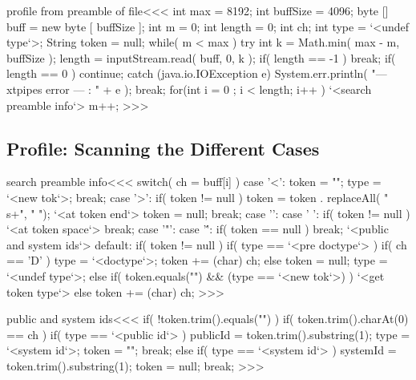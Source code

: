 \documentclass{article}
\begin{document}
 
 
\<profile from preamble of file\><<< 
int max = 8192; 
int buffSize = 4096;
byte [] buff = new byte [ buffSize ];
int m = 0; 
int length = 0; 
int ch;
int type = `<undef type`>;
String token = null;
while( m < max ){ 
   try{ 
      int k = Math.min( max - m, buffSize ); 
      length = inputStream.read( buff, 0, k ); 
      if( length == -1 ){ break; } 
      if( length == 0  ){ continue; }  
   } catch (java.io.IOException e){ 
      System.err.println( "--- xtpipes error --- : " + e );  
      break; 
   } 
   for(int i = 0 ; i < length; i++ ){ 
     `<search preamble info`> 
     m++; 
}  } 
>>> 


\subsection{Profile: Scanning the Different Cases}



 
\<search preamble info\><<< 
switch( ch = buff[i] ){ 
   case  '<':  token = ""; 
               type = `<new tok`>;
               break; 
   case  '>':  if( token != null ){
                  token = token . replaceAll( "\\s+", " ");
                  `<at token end`>
                  token = null;
               }
               break; 
   case '\n':  
   case  ' ':  if( token != null ){ 
                  `<at token space`>
               }
               break; 
   case  '"':
   case '\'':  if( token == null ){ break; }
               `<public and system ids`>
   default:    if( token != null ){                   
                  if( type == `<pre doctype`> ){
                     if( ch == 'D' ){
                        type = `<doctype`>;
                        token += (char) ch;
                     } else { token = null; type = `<undef type`>; }
                  } 
                  else 
                  if( token.equals("") && (type == `<new tok`>) ){
                     `<get token type`>
                  } else { token += (char) ch; }
}              } 
>>> 


\<public and system ids\><<<
if( !token.trim().equals("") ){
   if( token.trim().charAt(0) == ch ){
     if( type == `<public id`> ){
        publicId = token.trim().substring(1);
        type = `<system id`>;
        token = "";
        break;
     } 
     else if( type == `<system id`> ){
        systemId = token.trim().substring(1);
        token = null;
        break;
     }
} }
>>>
\end{document}

